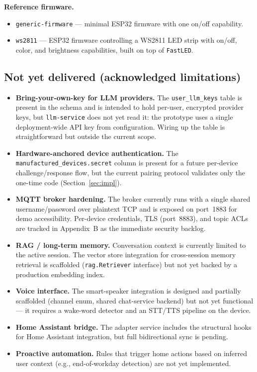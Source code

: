 \documentclass[a4paper,12pt]{article}
\begin{document}
\noindent\textbf{Reference firmware.}
\begin{itemize}
  \item \verb|generic-firmware| --- minimal ESP32 firmware with one on/off capability.
  \item \verb|ws2811| --- ESP32 firmware controlling a WS2811 LED strip with on/off, color, and brightness capabilities, built on top of \verb|FastLED|.
\end{itemize}

\subsection{Not yet delivered (acknowledged limitations)}

\begin{itemize}
  \item \textbf{Bring-your-own-key for LLM providers.} The \verb|user_llm_keys| table is present in the schema and is intended to hold per-user, encrypted provider keys, but \verb|llm-service| does not yet read it: the prototype uses a single deployment-wide API key from configuration. Wiring up the table is straightforward but outside the current scope.
  \item \textbf{Hardware-anchored device authentication.} The \verb|manufactured_devices.secret| column is present for a future per-device challenge/response flow, but the current pairing protocol validates only the one-time code (Section~\ref{sec:impl}).
  \item \textbf{MQTT broker hardening.} The broker currently runs with a single shared username/password over plaintext TCP and is exposed on port~1883 for demo accessibility. Per-device credentials, TLS (port~8883), and topic ACLs are tracked in Appendix~B as the immediate security backlog.
  \item \textbf{RAG / long-term memory.} Conversation context is currently limited to the active session. The vector store integration for cross-session memory retrieval is scaffolded (\verb|rag.Retriever| interface) but not yet backed by a production embedding index.
  \item \textbf{Voice interface.} The smart-speaker integration is designed and partially scaffolded (channel enum, shared chat-service backend) but not yet functional --- it requires a wake-word detector and an STT/TTS pipeline on the device.
  \item \textbf{Home Assistant bridge.} The adapter service includes the structural hooks for Home Assistant integration, but full bidirectional sync is pending.
  \item \textbf{Proactive automation.} Rules that trigger home actions based on inferred user context (e.g., end-of-workday detection) are not yet implemented.
\end{itemize}
\end{document}
